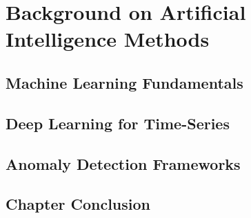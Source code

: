 \chapter{Background on Artificial Intelligence Methods}
\label{ch:ai-background}

\section{Machine Learning Fundamentals}
\label{sec:ml-background}


\section{Deep Learning for Time-Series}
\label{sec:dl-background}


\section{Anomaly Detection Frameworks}
\label{sec:anomaly-background}


\section*{Chapter Conclusion}
